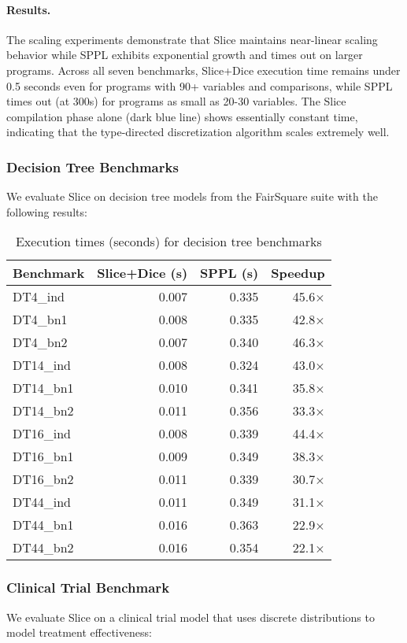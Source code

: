 

\paragraph{Results.} The scaling experiments demonstrate that Slice maintains near-linear scaling behavior while SPPL exhibits exponential growth and times out on larger programs. Across all seven benchmarks, Slice+Dice execution time remains under 0.5 seconds even for programs with 90+ variables and comparisons, while SPPL times out (at 300s) for programs as small as 20-30 variables. The Slice compilation phase alone (dark blue line) shows essentially constant time, indicating that the type-directed discretization algorithm scales extremely well.


\subsubsection{Decision Tree Benchmarks}
We evaluate Slice on decision tree models from the FairSquare suite with the following results:

\begin{table}[!t]
\centering
\begin{tabular}{lrrr}
\toprule
Benchmark & Slice+Dice (s) & SPPL (s) & Speedup \\
\midrule
DT4\_ind & 0.007 & 0.335 & 45.6× \\
DT4\_bn1 & 0.008 & 0.335 & 42.8× \\
DT4\_bn2 & 0.007 & 0.340 & 46.3× \\
DT14\_ind & 0.008 & 0.324 & 43.0× \\
DT14\_bn1 & 0.010 & 0.341 & 35.8× \\
DT14\_bn2 & 0.011 & 0.356 & 33.3× \\
DT16\_ind & 0.008 & 0.339 & 44.4× \\
DT16\_bn1 & 0.009 & 0.349 & 38.3× \\
DT16\_bn2 & 0.011 & 0.339 & 30.7× \\
DT44\_ind & 0.011 & 0.349 & 31.1× \\
DT44\_bn1 & 0.016 & 0.363 & 22.9× \\
DT44\_bn2 & 0.016 & 0.354 & 22.1× \\
\bottomrule
\end{tabular}
\caption{Execution times (seconds) for decision tree benchmarks}
\end{table}

\subsubsection{Clinical Trial Benchmark}
We evaluate Slice on a clinical trial model that uses discrete distributions to model treatment effectiveness:

